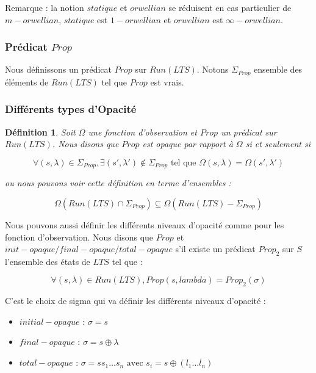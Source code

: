 \documentclass[10pt,a4paper]{article}
\newtheorem {mydef} {D\'efinition}
\begin{document}
	Remarque : la notion $statique$ et $orwellian$ se r\'eduisent en cas particulier de $m-orwellian$, $statique$ est $1-orwellian$ et $orwellian$ est $\infty-orwellian$.

\subsubsection{Pr\'edicat $Prop$}	
	Nous d\'efinissons un pr\'edicat $Prop$ sur $Run(LTS)$. Notons $\Sigma_{Prop}$ ensemble des \'el\'ements de $Run(LTS)$ tel que $Prop$ est vrais.
	
\subsubsection{Diff\'erents types d'Opacit\'e}

\begin{mydef}
	Soit $\Omega$ une fonction d'observation et $Prop$ un pr\'edicat sur $Run(LTS)$. Nous disons que $Prop$ est opaque par rapport \`a $\Omega$ si et seulement si
	
	$$\forall (s,\lambda) \in \Sigma_{Prop}, \exists (s',\lambda')\not\in \Sigma_{Prop} \mbox{ tel que } \Omega(s,\lambda) = \Omega (s',\lambda')$$
	
	ou nous pouvons voir cette d\'efinition en terme d'ensembles :
	
	$$\Omega(Run(LTS)\cap \Sigma_{Prop})\subseteq \Omega(Run(LTS)-\Sigma_{Prop})$$
\end{mydef}

Nous pouvons aussi d\'efinir les diff\'erents niveaux d'opacit\'e comme pour les fonction d'observation. Nous disons que $Prop$ et $init-opaque/final-opaque/total-opaque$ s'il existe un pr\'edicat $Prop_2$ sur $S$ l'ensemble des \'etats de $LTS$ tel que :

$$\forall (s,\lambda) \in Run(LTS), Prop(s,lambda) = Prop_2(\sigma)$$

C'est le choix de sigma qui va d\'efinir les diff\'erents niveaux d'opacit\'e :

\begin{itemize}
	\item $initial-opaque$ : $\sigma = s$
	\item $final-opaque$ : $\sigma = s\oplus \lambda$
	\item $total-opaque$ : $\sigma = s s_1 \dots s_n \mbox{ avec } s_i = s\oplus(l_1\dots l_n)$
\end{itemize} 
\end{document}
